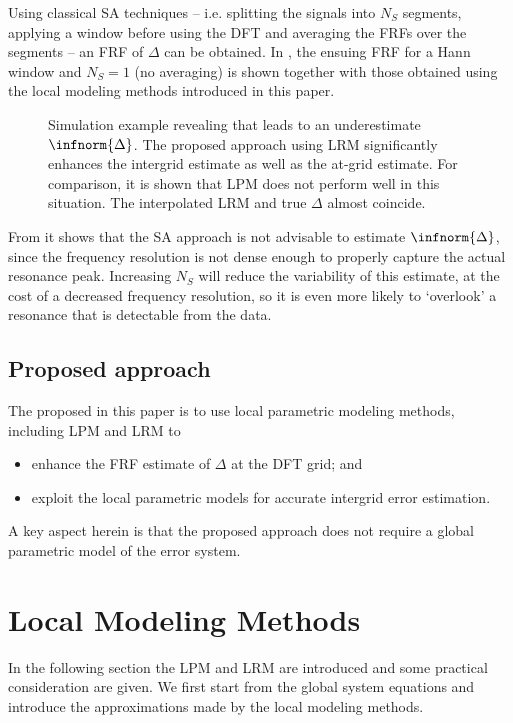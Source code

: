 Using classical \gls{SA} techniques -- i.e. splitting the signals into $N_S$ segments, applying a window before using the \gls{DFT} and averaging the \glspl{FRF} over the segments -- an \gls{FRF} of $\Delta$ can be obtained.
In , the ensuing \gls{FRF} for a Hann window and $N_S=1$ (no averaging) is shown together with those obtained using the local modeling methods introduced in this paper.

\begin{figure}
  \centering
  \setlength{\figurewidth}{0.9\columnwidth}
  \setlength{\figureheight}{0.8\figurewidth}
  
  \caption{Simulation example revealing that  leads to an underestimate $\infnorm{\Delta}$. The proposed approach using \gls{LRM} significantly enhances the intergrid estimate as well as the at-grid estimate. For comparison, it is shown that \gls{LPM} does not perform well in this situation. The interpolated \gls{LRM} and true $\Delta$ almost coincide.}
  \label{fig:exampleFRF}
\end{figure}

From  it shows that the \gls{SA} approach is not advisable to estimate $\infnorm{\Delta}$, since the frequency resolution is not dense enough to properly capture the actual resonance peak.
Increasing $N_S$ will reduce the variability of this estimate, at the cost of a decreased frequency resolution, so it is even more likely to `overlook' a resonance that is detectable from the data.

\subsection{Proposed approach}
The proposed in this paper is to use local parametric modeling methods, including \gls{LPM} and \gls{LRM} to
\begin{itemize}
\item enhance the \gls{FRF} estimate of $\Delta$ at the \gls{DFT} grid; and
\item exploit the local parametric models for accurate intergrid error estimation.
\end{itemize}
A key aspect herein is that the proposed approach does not require a global parametric model of the error system.

\section{Local Modeling Methods}
\label{sec:LocalModels}
In the following section the \gls{LPM} and \gls{LRM} are introduced and some practical consideration are given.
We first start from the global system equations and introduce the approximations made by the local modeling methods.

